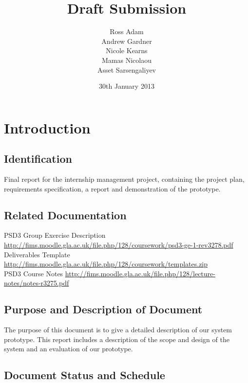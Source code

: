 \documentclass{l3deliverable}
\title{Draft Submission}
\author{Ross Adam \\
        Andrew Gardner \\
        Nicole Kearns \\
        Mamas Nicolaou\\
	Asset Sarsengaliyev\\}
\date{30th January 2013}
\begin{document}

\maketitle

\tableofcontents

\newpage


\section{Introduction}

\subsection{Identification}
Final report for the internship management project, containing the project plan, requirements specification, a report and demonstration of the prototype.

\subsection{Related Documentation}

PSD3 Group Exercise Description \url{http://fims.moodle.gla.ac.uk/file.php/128/coursework/psd3-ge-1-rev3278.pdf}\\

Deliverables Template \url{http://fims.moodle.gla.ac.uk/file.php/128/coursework/templates.zip}\\

PSD3 Course Notes \url{http://fims.moodle.gla.ac.uk/file.php/128/lecture-notes/notes-r3275.pdf}\\

\subsection{Purpose and Description of Document}
The purpose of this document is to give a detailed description of our
system prototype. This report includes a description of the scope and
design of the system and an evaluation of our prototype.
\subsection{Document Status and Schedule}
\end{document}

